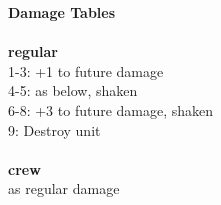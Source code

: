 {\bf Damage Tables} \\
\ \\ {\bf regular } \\
1-3: +1 to future damage \\
4-5: as below, shaken \\
6-8: +3 to future damage, shaken \\
9: Destroy unit \\
\ \\ {\bf crew } \\
as regular damage \\










